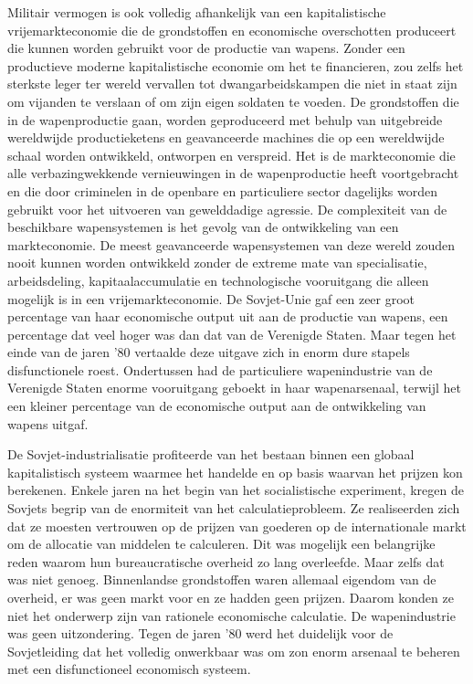\documentclass[
  a5paper,
  smalldemyvopaper,11pt,twoside,onecolumn,openright,extrafontsizes,
hidelinks]{memoir}
\begin{document}
Militair vermogen is ook volledig afhankelijk van een kapitalistische
vrijemarkteconomie die de grondstoffen en economische overschotten
produceert die kunnen worden gebruikt voor de productie van wapens.
Zonder een productieve moderne kapitalistische economie om het te
financieren, zou zelfs het sterkste leger ter wereld vervallen tot
dwangarbeidskampen die niet in staat zijn om vijanden te verslaan of om
zijn eigen soldaten te voeden. De grondstoffen die in de wapenproductie
gaan, worden geproduceerd met behulp van uitgebreide wereldwijde
productieketens en geavanceerde machines die op een wereldwijde schaal
worden ontwikkeld, ontworpen en verspreid. Het is de markteconomie die
alle verbazingwekkende vernieuwingen in de wapenproductie heeft
voortgebracht en die door criminelen in de openbare en particuliere
sector dagelijks worden gebruikt voor het uitvoeren van gewelddadige
agressie. De complexiteit van de beschikbare wapensystemen is het gevolg
van de ontwikkeling van een markteconomie. De meest geavanceerde
wapensystemen van deze wereld zouden nooit kunnen worden ontwikkeld
zonder de extreme mate van specialisatie, arbeidsdeling,
kapitaalaccumulatie en technologische vooruitgang die alleen mogelijk is
in een vrijemarkteconomie. De Sovjet-Unie gaf een zeer groot percentage
van haar economische output uit aan de productie van wapens, een
percentage dat veel hoger was dan dat van de Verenigde Staten. Maar
tegen het einde van de jaren '80 vertaalde deze uitgave zich in enorm
dure stapels disfunctionele roest. Ondertussen had de particuliere
wapenindustrie van de Verenigde Staten enorme vooruitgang geboekt in
haar wapenarsenaal, terwijl het een kleiner percentage van de
economische output aan de ontwikkeling van wapens uitgaf.

De Sovjet-industrialisatie profiteerde van het bestaan binnen een
globaal kapitalistisch systeem waarmee het handelde en op basis waarvan
het prijzen kon berekenen. Enkele jaren na het begin van het
socialistische experiment, kregen de Sovjets begrip van de enormiteit
van het calculatieprobleem. Ze realiseerden zich dat ze moesten
vertrouwen op de prijzen van goederen op de internationale markt om de
allocatie van middelen te calculeren. Dit was mogelijk een belangrijke
reden waarom hun bureaucratische overheid zo lang overleefde. Maar zelfs
dat was niet genoeg. Binnenlandse grondstoffen waren allemaal eigendom
van de overheid, er was geen markt voor en ze hadden geen prijzen.
Daarom konden ze niet het onderwerp zijn van rationele economische
calculatie. De wapenindustrie was geen uitzondering. Tegen de jaren '80
werd het duidelijk voor de Sovjetleiding dat het volledig onwerkbaar was
om zon enorm arsenaal te beheren met een disfunctioneel economisch
systeem.
\end{document}
